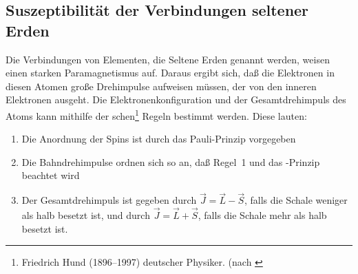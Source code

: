 \subsection{Suszeptibilität der Verbindungen seltener Erden}

Die Verbindungen von Elementen, die Seltene Erden genannt werden, weisen
einen starken Paramagnetismus auf.  Daraus ergibt sich, daß die
Elektronen in diesen Atomen große Drehimpulse aufweisen müssen, der von
den inneren Elektronen ausgeht.  Die Elektronenkonfiguration und der
Gesamtdrehimpuls des Atoms kann mithilfe der
schen\footnote{Friedrich Hund (1896--1997) deutscher
  Physiker. (nach \textcite{wikipedia:friedrich-hund}} Regeln bestimmt
werden. Diese lauten:

\begin{enumerate}
\item Die Anordnung der Spins ist durch das Pauli-Prinzip vorgegeben
\item Die Bahndrehimpulse ordnen sich so an, daß Regel~1 und das
  -Prinzip beachtet wird
\item Der Gesamtdrehimpuls ist gegeben durch $\vec{J} = \vec{L} -
  \vec{S}$, falls die Schale weniger als halb besetzt ist, und durch
  $\vec{J} = \vec{L} + \vec{S}$, falls die Schale mehr als halb besetzt
  ist.
\end{enumerate}
